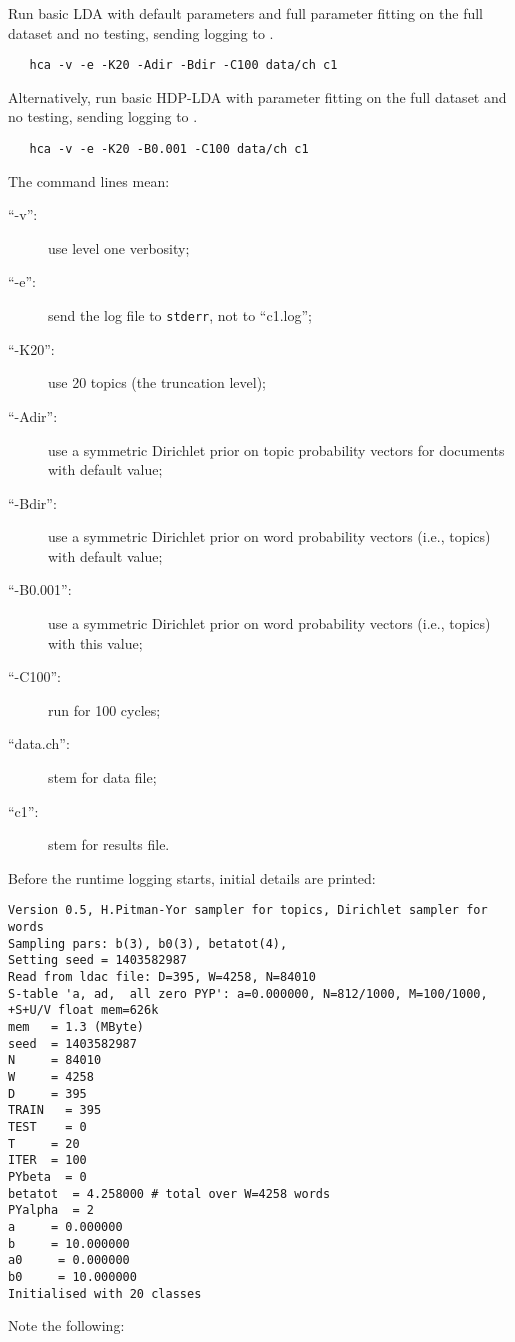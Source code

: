 \documentclass[a4paper,english]{article}
\begin{document}
Run basic LDA with default parameters
and full parameter fitting on the full dataset and no testing,
sending logging to .
\begin{verbatim}
   hca -v -e -K20 -Adir -Bdir -C100 data/ch c1
\end{verbatim}
Alternatively, 
run basic HDP-LDA with parameter fitting on the full dataset and no testing,
sending logging to .
\begin{verbatim}
   hca -v -e -K20 -B0.001 -C100 data/ch c1
\end{verbatim}
The command lines mean:
\begin{description}
\item[``-v'':] use level one verbosity;
\item[``-e'':] send the log file to  \texttt{stderr},
not to ``c1.log'';
\item[``-K20'':] use 20 topics (the truncation level);
\item[``-Adir'':]  use a symmetric Dirichlet prior on topic probability
vectors for documents with default value;
\item[``-Bdir'':]  use a symmetric Dirichlet prior on word probability
vectors (i.e., topics) with default value;
\item[``-B0.001'':]  use a symmetric Dirichlet prior on word probability
vectors (i.e., topics) with this value;
\item[``-C100'':] run for 100 cycles;
\item[``data.ch'':] stem for data file;
\item[``c1'':] stem for results file.
\end{description}
Before the runtime logging starts, initial details are printed:
\begin{verbatim}
Version 0.5, H.Pitman-Yor sampler for topics, Dirichlet sampler for words
Sampling pars: b(3), b0(3), betatot(4),
Setting seed = 1403582987
Read from ldac file: D=395, W=4258, N=84010
S-table 'a, ad,  all zero PYP': a=0.000000, N=812/1000, M=100/1000, +S+U/V float mem=626k
mem   = 1.3 (MByte)
seed  = 1403582987
N     = 84010
W     = 4258
D     = 395
TRAIN   = 395
TEST    = 0
T     = 20
ITER  = 100
PYbeta  = 0
betatot  = 4.258000 # total over W=4258 words
PYalpha  = 2
a     = 0.000000
b     = 10.000000
a0     = 0.000000
b0     = 10.000000
Initialised with 20 classes
\end{verbatim}
Note the following:
\end{document}
